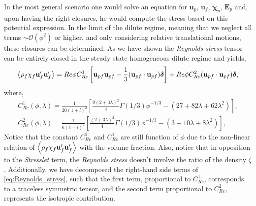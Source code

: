 In the most general scenario one would solve an equation for $\textbf{u}_p$, $\textbf{u}_f$, $\bm\chi_p$, $\textbf{E}_p$ and, upon having the right closures, he would compute the stress based on this potential expression. 
In the limit of the dilute regime, meaning that we neglect all terms $\sim \mathcal{O}(\phi^2)$ or higher, and only considering relative translational motions, these closures can be determined. 
As we have shown the \textit{Reynolds stress} tensor can be entirely closed in the steady state homogeneous dilute regime and yields, 
\begin{equation}
    \left<\rho_f\chi_f\textbf{u}_f'\textbf{u}'_f\right>
    = Re  \phi C_{Re}^1 \left[
        \textbf{u}_{pf}
        \textbf{u}_{pf}
        -\frac{1}{3}
        (\textbf{u}_{pf}
        \cdot\textbf{u}_{pf})\bm\delta
    \right]
    + Re \phi C_{Re}^2 (\textbf{u}_{pf}\cdot\textbf{u}_{pf}) \bm\delta, 
    \label{eq:Reynolds_stress}
\end{equation}
where, 
\begin{align*}
    C_{Re}^1(\phi,\lambda)
    = \frac{1}{20(1+l)^2}\left[
        \frac{9(2+3\lambda)^2}{4}\Gamma(1/3) \phi^{-1/3}
        - (27+82\lambda +62\lambda^2)
    \right],\\
    C_{Re}^2(\phi,\lambda)
    = \frac{1}{6(1+l)^2}\left[
        \frac{(2+3\lambda)^2}{4}\Gamma(1/3) \phi^{-1/3}
        - (3+10\lambda +8\lambda^2)
    \right],
\end{align*}
Notice that the constant $C_{Re}^2$ and $C_{Re}^1$ are still function of $\phi$ due to the non-linear relation of $\left<\rho_f\chi_f\textbf{u}_f'\textbf{u}'_f\right>$ with the volume fraction. 
Also, notice that in opposition to the \textit{Stresslet} term, the \textit{Reynolds stress} doesn't involve the ratio of the density $\zeta$. 
Additionally, we have decomposed the right-hand side terms of \ref{eq:Reynolds_stress}, such that the first term, proportional to $C_{Re}^1$, corresponds to a traceless symmetric tensor, and the second term proportional to $C_{Re}^2$, represents the isotropic contribution.  

